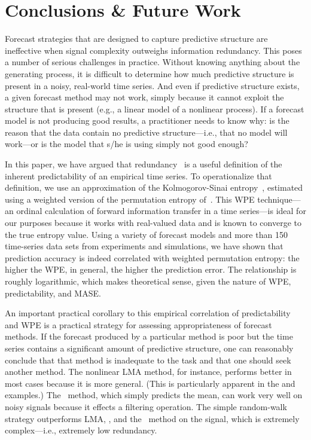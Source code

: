 \section{ Conclusions \& Future Work }\label{sec:conc}


Forecast strategies that are designed to capture predictive structure
are ineffective when signal complexity outweighs information
redundancy.  This poses a number of serious challenges in practice.
Without knowing anything about the generating process, it is difficult
to determine how much predictive structure is present in a noisy,
real-world time series.  And even if predictive structure exists, a
given forecast method may not work, simply because it cannot exploit
the structure that is present (e.g., a linear model of a nonlinear
process).  If a forecast model is not producing good results, a
practitioner needs to know why: is the reason that the data contain no
predictive structure---i.e., that no model will work---or is the model
that s/he is using simply not good enough?

In this paper, we have argued that redundancy~\cite{crutchfield2003}
is a useful definition of the inherent predictability of an empirical
time series.  To operationalize that definition, we use an
approximation of the Kolmogorov-Sinai entropy~\cite{lind95}, estimated
using a weighted version of the permutation entropy
of~\cite{bandt2002per}.  This WPE technique---an ordinal calculation
of forward information transfer in a time series---is ideal for our
purposes because it works with real-valued data and is known to
converge to the true entropy value. Using a variety of forecast models
and more than 150 time-series data sets from experiments and
simulations, we have shown that prediction accuracy is indeed
correlated with weighted permutation entropy: the higher the WPE, in
general, the higher the prediction error.  The relationship is roughly
logarithmic, which makes theoretical sense, given the nature of WPE,
predictability, and MASE.

An important practical corollary to this empirical correlation of
predictability and WPE is a practical strategy for assessing
appropriateness of forecast methods.  If the forecast produced by a
particular method is poor but the time series contains a significant
amount of predictive structure, one can reasonably conclude that that
method is inadequate to the task and that one should seek another
method.  The nonlinear LMA method, for instance, performs better in
most cases because it is more general.  (This is particularly apparent
in the \col and \svdfive examples.)
The \naive ~method, which simply predicts the mean, can work very well
on noisy signals because it effects a filtering operation.  The simple
random-walk strategy outperforms LMA, \arima, and the \naive
~method on the \gcc signal, which is extremely complex---i.e.,
extremely low redundancy.

